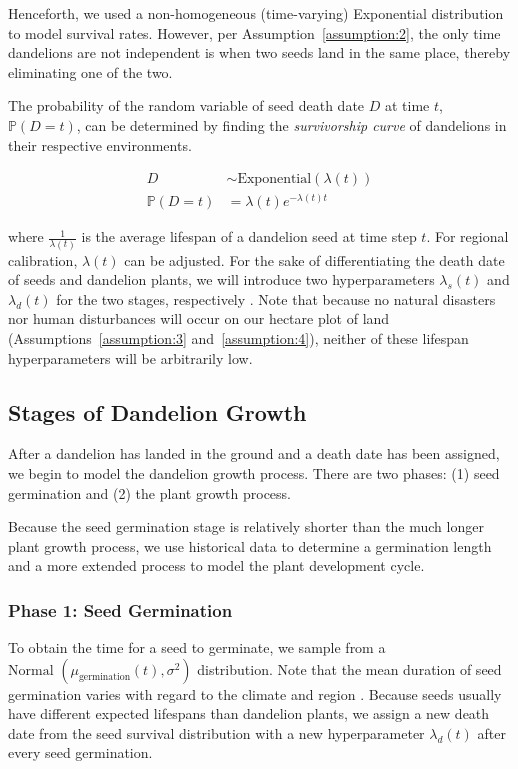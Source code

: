 Henceforth, we used a non-homogeneous (time-varying) Exponential distribution to model survival rates. However, per Assumption~\ref{assumption:2}, the only time dandelions are not independent is when two seeds land in the same place, thereby eliminating one of the two.

The probability of the random variable of seed death date \(D\) at time \(t\), \(\mathbb{P}(D = t)\), can be determined by finding the \textit{survivorship curve} of dandelions in their respective environments. 

\begin{align}
    D & \sim \text{Exponential}(\lambda(t)) \nonumber  \\
    \mathbb{P}(D = t) & = \lambda(t) e^{-\lambda(t) t}
\end{align}

where \(\frac{1}{\lambda(t)}\) is the average lifespan of a dandelion seed at time step \(t\). For regional calibration, \(\lambda(t)\) can be adjusted. For the sake of differentiating the death date of seeds and dandelion plants, we will introduce two hyperparameters \(\lambda_s(t)\) and \(\lambda_d(t)\) for the two stages, respectively \cite{board_of_pesticides_control_maine_dacf_dandelion-taraxacum_nodate}. Note that because no natural disasters nor human disturbances will occur on our hectare plot of land (Assumptions~\ref{assumption:3} and~\ref{assumption:4}), neither of these lifespan hyperparameters will be arbitrarily low.

\subsection{Stages of Dandelion Growth}

After a dandelion has landed in the ground and a death date has been assigned, we begin to model the dandelion growth process. There are two phases: (1) seed germination and (2) the plant growth process.

Because the seed germination stage is relatively shorter than the much longer plant growth process, we use historical data to determine a germination length and a more extended process to model the plant development cycle.

\subsubsection{Phase 1: Seed Germination}

To obtain the time for a seed to germinate, we sample from a \(\text{Normal } (\mu_{\text{germination}}(t), \sigma^2)\) distribution. Note that the mean duration of seed germination varies with regard to the climate and region \cite{board_of_pesticides_control_maine_dacf_dandelion-taraxacum_nodate}. Because seeds usually have different expected lifespans than dandelion plants, we assign a new death date from the seed survival distribution with a new hyperparameter \(\lambda_d(t)\) after every seed germination.

